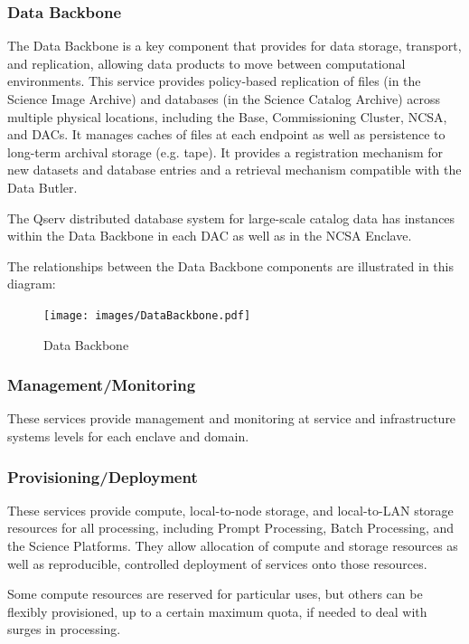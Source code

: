 \documentclass[]{article}
\begin{document}
\subsubsection{Data Backbone}\label{data-backbone}

The Data Backbone is a key component that provides for data storage,
transport, and replication, allowing data products to move between
computational environments. This service provides policy-based
replication of files (in the Science Image Archive) and databases (in
the Science Catalog Archive) across multiple physical locations,
including the Base, Commissioning Cluster, NCSA, and DACs. It manages
caches of files at each endpoint as well as persistence to long-term
archival storage (e.g. tape). It provides a registration mechanism for
new datasets and database entries and a retrieval mechanism compatible
with the Data Butler.

The Qserv distributed database system for large-scale catalog data has
instances within the Data Backbone in each DAC as well as in the NCSA
Enclave.

The relationships between the Data Backbone components are illustrated
in this diagram:

\begin{figure}
\centering
\texttt{[image: images/DataBackbone.pdf]}
\caption{Data Backbone}
\end{figure}

\subsubsection{Management/Monitoring}\label{managementmonitoring}

These services provide management and monitoring at service and
infrastructure systems levels for each enclave and domain.

\subsubsection{Provisioning/Deployment}\label{provisioningdeployment}

These services provide compute, local-to-node storage, and local-to-LAN
storage resources for all processing, including Prompt Processing, Batch
Processing, and the Science Platforms. They allow allocation of compute
and storage resources as well as reproducible, controlled deployment of
services onto those resources.

Some compute resources are reserved for particular uses, but others can
be flexibly provisioned, up to a certain maximum quota, if needed to
deal with surges in processing.
\end{document}
